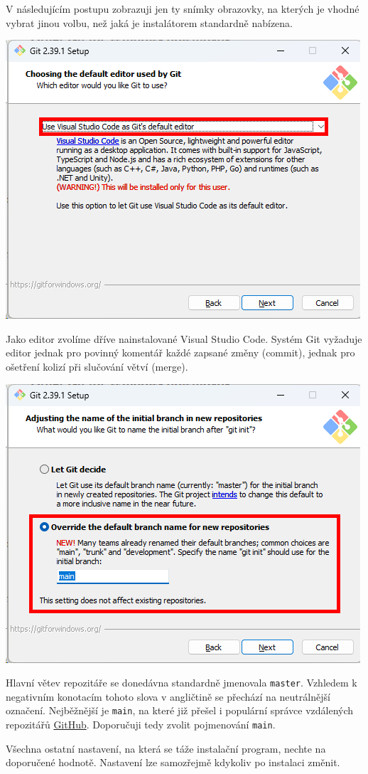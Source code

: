 \documentclass[a4paper,11pt,twoside]{article}
\def\code#1{\textnormal{\texttt{#1}}}
\theoremstyle{red}
\theoremstyle{green}
\begin{document}
    V následujícím postupu zobrazuji jen ty snímky obrazovky, na kterých je vhodné vybrat jinou volbu, než jaká je instalátorem standardně nabízena.
    \begin{center}\includegraphics[width=0.5\linewidth]{GitInstallEditor.png}\end{center}
    Jako editor zvolíme dříve nainstalované Visual Studio Code.
    Systém Git vyžaduje editor jednak pro povinný komentář každé zapsané změny (commit), jednak pro ošetření kolizí při slučování větví (merge).
    \begin{center}\includegraphics[width=0.5\linewidth]{GitInstallMain.png}\end{center}
    Hlavní větev repozitáře se donedávna standardně jmenovala \code{master}.
    Vzhledem k negativním konotacím tohoto slova v angličtině se přechází na neutrálnější označení.
    Nejběžnější je \code{main}, na které již přešel i populární správce vzdálených repozitářů \href{https://github.com}{GitHub}.
    Doporučuji tedy zvolit pojmenování \code{main}.

    Všechna ostatní nastavení, na která se táže instalační program, nechte na doporučené hodnotě. 
    Nastavení lze samozřejmě kdykoliv po instalaci změnit.
\end{document}
